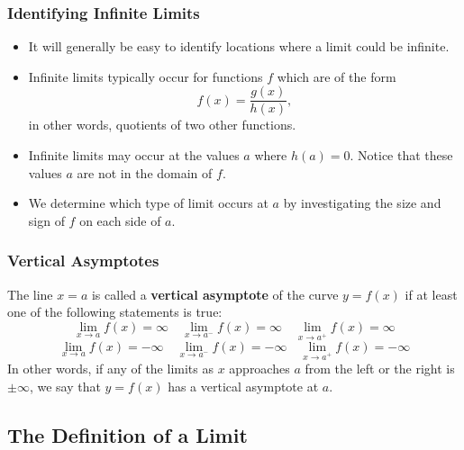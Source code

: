 \documentclass[serif,ignorenonframetext]{beamer}
\begin{document}
\begin{frame}
  \frametitle{Identifying Infinite Limits}
  \begin{itemize}
  \item It will generally be easy to identify locations where a limit
    could be infinite.
    
    \pause
  \item Infinite limits typically occur for functions $f$ which are of
    the form
    \begin{displaymath}
      f(x) = \frac{g(x)}{h(x)},
    \end{displaymath}
    in other words, quotients of two other functions.
    
    \pause
  \item Infinite limits may occur at the values $a$ where $h(a)=0$.
    Notice that these values $a$ are not in the domain of $f$.
    
    \pause
  \item We determine which type of limit occurs at $a$ by
    investigating the size and sign of $f$ on each side of $a$.
  \end{itemize}
\end{frame}

\begin{frame}
  \frametitle{Vertical Asymptotes}
  The line $x=a$ is called a \textbf{vertical asymptote} of the curve
  $y=f(x)$ if at least one of the following statements is true:
  \begin{displaymath}
    \lim_{x\to a} f(x) = \infty
    \quad
    \lim_{x\to a^-} f(x) = \infty
    \quad
    \lim_{x\to a^+} f(x) = \infty
  \end{displaymath}
  \begin{displaymath}
    \lim_{x\to a} f(x) = -\infty
    \quad
    \lim_{x\to a^-} f(x) = -\infty
    \quad
    \lim_{x\to a^+} f(x) = -\infty
  \end{displaymath}
  In other words, if any of the limits as $x$ approaches $a$ from the
  left or the right is $\pm\infty$, we say that $y=f(x)$ has a
  vertical asymptote at $a$.
\end{frame}


\subsection{The Definition of a Limit}
\end{document}
